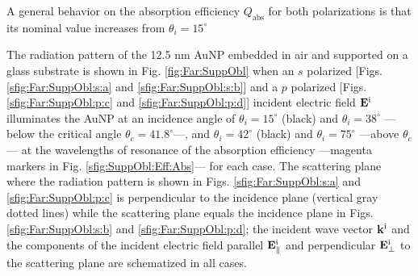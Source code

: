 A general behavior on the absorption efficiency $Q_\text{abs}$ for both polarizations is that its nominal value increases from $\theta_i = 15^\circ$

The radiation pattern of the 12.5 nm AuNP embedded in air and supported on a glass substrate is shown in Fig. \ref{fig:Far:SuppObl} when an $s$ polarized [Figs. \ref{sfig:Far:SuppObl:s:a} and \ref{sfig:Far:SuppObl:s:b}] and a  $p$ polarized [Figs. \ref{sfig:Far:SuppObl:p:c} and \ref{sfig:Far:SuppObl:p:d}] incident electric field $\vb{E}^\text{i}$ illuminates the AuNP at an incidence angle of $\theta_i = 15^\circ$ (black) and $\theta_i = 38^\circ$ ---below the critical angle $\theta_c = 41.8^\circ$---, and $\theta_i = 42^\circ$ (black) and $\theta_i = 75^\circ$ ---above  $\theta_c$--- at the wavelengths of resonance of the absorption efficiency ---magenta markers in Fig. \ref{sfig:SuppObl:Eff:Abs}--- for each case. The scattering plane where the radiation pattern is shown in Figs. \ref{sfig:Far:SuppObl:s:a} and \ref{sfig:Far:SuppObl:p:c}  is perpendicular to the incidence plane (vertical gray dotted lines) while the scattering plane equals the incidence plane in Figs. \ref{sfig:Far:SuppObl:s:b} and \ref{sfig:Far:SuppObl:p:d}; the incident wave vector $\vb{k}^\text{i}$ and the components of the incident electric field parallel $\vb{E}^\text{i}_\parallel$ and perpendicular $\vb{E}^\text{i}_\perp$ to the scattering plane are schematized in all cases.

